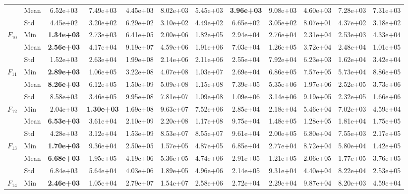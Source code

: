 \begin{center}
\begin{longtable}{clcccccccccc}
 & Mean & 6.52e+03 & 7.49e+03 & 4.45e+03 & 8.02e+03 & 5.45e+03 & \textbf{3.96e+03} & 9.08e+03 & 4.60e+03 & 7.28e+03 & 7.31e+03 \\
 & Std & 4.45e+02 & 3.20e+02 & 6.29e+02 & 3.10e+02 & 4.49e+02 & 6.65e+02 & 3.05e+02 & 8.07e+01 & 4.37e+02 & 3.18e+02 \\
\midrule
\multirow{3}{*}{$F_{10}$} & Min & \textbf{1.34e+03} & 2.73e+03 & 6.41e+05 & 2.00e+06 & 1.82e+05 & 2.94e+04 & 2.76e+04 & 2.31e+04 & 2.53e+03 & 4.33e+04 \\
 & Mean & \textbf{2.56e+03} & 4.17e+04 & 9.19e+07 & 4.59e+06 & 1.91e+06 & 7.03e+04 & 1.26e+05 & 3.72e+04 & 2.48e+04 & 1.01e+05 \\
 & Std & 1.52e+03 & 2.63e+04 & 1.99e+08 & 2.14e+06 & 2.11e+06 & 2.55e+04 & 7.92e+04 & 6.23e+03 & 1.62e+04 & 3.42e+04 \\
\midrule
\multirow{3}{*}{$F_{11}$} & Min & \textbf{2.89e+03} & 1.06e+05 & 3.22e+08 & 4.07e+08 & 1.03e+07 & 2.69e+04 & 6.86e+05 & 7.57e+05 & 5.73e+04 & 8.86e+05 \\
 & Mean & \textbf{8.26e+03} & 6.12e+05 & 1.50e+09 & 5.09e+08 & 1.15e+08 & 7.39e+05 & 5.35e+06 & 1.97e+06 & 2.52e+05 & 3.73e+06 \\
 & Std & 8.58e+03 & 3.46e+05 & 9.95e+08 & 7.81e+07 & 1.09e+08 & 1.09e+06 & 3.14e+06 & 9.19e+05 & 2.32e+05 & 1.66e+06 \\
\midrule
\multirow{3}{*}{$F_{12}$} & Min & 2.04e+03 & \textbf{1.30e+03} & 1.69e+08 & 9.63e+07 & 7.52e+06 & 2.85e+04 & 2.18e+04 & 5.46e+04 & 7.02e+03 & 4.59e+04 \\
 & Mean & \textbf{6.53e+03} & 3.61e+04 & 2.10e+09 & 2.20e+08 & 1.17e+08 & 9.75e+04 & 1.48e+05 & 1.28e+05 & 1.81e+04 & 1.75e+05 \\
 & Std & 4.28e+03 & 3.12e+04 & 1.53e+09 & 8.53e+07 & 8.55e+07 & 9.61e+04 & 2.00e+05 & 6.80e+04 & 7.55e+03 & 2.17e+05 \\
\midrule
\multirow{3}{*}{$F_{13}$} & Min & \textbf{1.70e+03} & 9.36e+04 & 2.50e+05 & 1.57e+05 & 4.87e+05 & 6.85e+04 & 2.77e+04 & 8.72e+04 & 5.80e+04 & 1.42e+05 \\
 & Mean & \textbf{6.68e+03} & 1.95e+05 & 4.19e+06 & 5.36e+05 & 4.74e+06 & 2.91e+05 & 1.21e+05 & 2.06e+05 & 1.77e+05 & 3.76e+05 \\
 & Std & 6.84e+03 & 5.64e+04 & 4.03e+06 & 1.89e+05 & 4.96e+06 & 2.14e+05 & 9.31e+04 & 4.40e+04 & 8.22e+04 & 2.53e+05 \\
\midrule
\multirow{3}{*}{$F_{14}$} & Min & \textbf{2.46e+03} & 1.05e+04 & 2.79e+07 & 1.54e+07 & 2.58e+06 & 2.72e+04 & 2.29e+04 & 9.87e+04 & 8.20e+03 & 4.59e+04 \\

\end{longtable}
\end{center}
